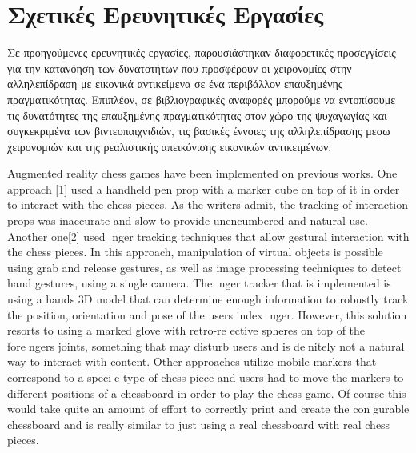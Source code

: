 \section{Σχετικές Ερευνητικές Εργασίες}
Σε προηγούμενες ερευνητικές εργασίες, παρουσιάστηκαν διαφορετικές προσεγγίσεις για την κατανόηση των δυνατοτήτων που προσφέρουν οι χειρονομίες στην αλληλεπίδραση με εικονικά αντικείμενα σε ένα περιβάλλον επαυξημένης πραγματικότητας. Επιπλέον, σε βιβλιογραφικές αναφορές μπορούμε να εντοπίσουμε τις δυνατότητες της επαυξημένης πραγματικότητας στον χώρο της ψυχαγωγίας και συγκεκριμένα των βιντεοπαιχνιδιών, τις βασικές έννοιες της αλληλεπίδρασης μεσω χειρονομιών και της ρεαλιστικής απεικόνισης εικονικών αντικειμένων.


Augmented reality chess games have been implemented on previous works. One approach
[1] used a handheld pen prop with a marker cube on top of it in order to interact with the
chess pieces. As the writers admit, the tracking of interaction props was inaccurate and slow
to provide unencumbered and natural use. Another one[2] used nger tracking techniques that
allow gestural interaction with the chess pieces. In this approach, manipulation of virtual objects
is possible using grab and release gestures, as well as image processing techniques to detect hand
gestures, using a single camera. The nger tracker that is implemented is using a hands 3D
model that can determine enough information to robustly track the position, orientation and
pose of the users index nger. However, this solution resorts to using a marked glove with
retro-re
ective spheres on top of the forengers joints, something that may disturb users and is
denitely not a natural way to interact with content. Other approaches utilize mobile markers
that correspond to a specic type of chess piece and users had to move the markers to different
positions of a chessboard in order to play the chess game. Of course this would take quite an
amount of effort to correctly print and create the congurable chessboard and is really similar
to just using a real chessboard with real chess pieces.


